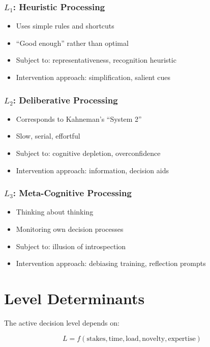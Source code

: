 \subsubsection{$L_1$: Heuristic Processing}
\begin{itemize}[nosep]
\item Uses simple rules and shortcuts
\item ``Good enough'' rather than optimal
\item Subject to: representativeness, recognition heuristic
\item Intervention approach: simplification, salient cues
\end{itemize}

\subsubsection{$L_2$: Deliberative Processing}
\begin{itemize}[nosep]
\item Corresponds to Kahneman's ``System 2''
\item Slow, serial, effortful
\item Subject to: cognitive depletion, overconfidence
\item Intervention approach: information, decision aids
\end{itemize}

\subsubsection{$L_3$: Meta-Cognitive Processing}
\begin{itemize}[nosep]
\item Thinking about thinking
\item Monitoring own decision processes
\item Subject to: illusion of introspection
\item Intervention approach: debiasing training, reflection prompts
\end{itemize}

\section{Level Determinants}
\label{sec:hier-determinants}

The active decision level depends on:

\begin{equation}
L = f(\text{stakes}, \text{time}, \text{load}, \text{novelty}, \text{expertise})
\end{equation}

